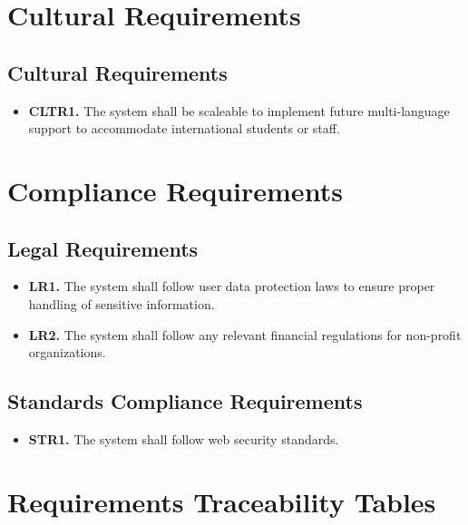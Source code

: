 \documentclass[12pt]{article}
\begin{document}
\section{Cultural Requirements}
\subsection{Cultural Requirements}
\begin{itemize}
    \item \textbf{CLTR1.} The system shall be scaleable to implement future multi-language support to accommodate international students or staff.
\end{itemize}

\section{Compliance Requirements}
\subsection{Legal Requirements}
\begin{itemize}
    \item \textbf{LR1.} The system shall follow user data protection laws to ensure proper handling of sensitive information.
    \item \textbf{LR2.} The system shall follow any relevant financial regulations for non-profit organizations.
\end{itemize}
\subsection{Standards Compliance Requirements}
\begin{itemize}
    \item \textbf{STR1.} The system shall follow web security standards.
\end{itemize}

\section{Requirements Traceability Tables}
\end{document}
